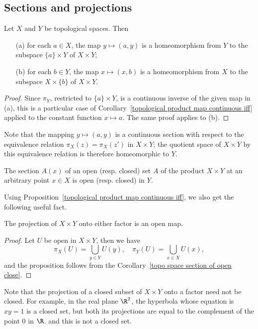 \subsection{Sections and projections}
\begin{proposition}\label{topo space section map homeomorphism}
Let $X$ and $Y$ be topological spaces. Then
\begin{itemize}
\item[(a)] for each $a\in X$, the map $y\mapsto(a,y)$ is a homeomorphism from $Y$ to the subspace $\{a\}\times Y$ of $X\times Y$;
\item[(b)] for each $b\in Y$, the map $x\mapsto(x,b)$ is a homeomorphism from $X$ to the subspace $X\times\{b\}$ of $X\times Y$.
\end{itemize}
\end{proposition}
\begin{proof}
Since $\pi_Y$, restricted to $\{a\}\times Y$, is a continuous inverse of the given map in (a), this is a particular case of Corollary~\ref{topological product map continuous iff} applied to the constant function $x\mapsto a$. The same proof applies to (b).
\end{proof}
Note that the mapping $y\mapsto(a,y)$ is a continuous section with respect to the equivalence relation $\pi_X(z)=\pi_X(z')$ in $X\times Y$; the quotient space of $X\times Y$ by this equivalence relation is therefore homeomorphic to $Y$.
\begin{corollary}\label{topo space section of open close}
The section $A(x)$ of an open (resp. closed) set $A$ of the product $X\times Y$ at an arbitrary point $x\in X$ is open (resp. closed) in $Y$.
\end{corollary}
Using Proposition~\ref{topological product map continuous iff}, we also get the following useful fact.
\begin{proposition}\label{topo space projection is open}
The projection of $X\times Y$ onto either factor is an open map.
\end{proposition}
\begin{proof}
Let $U$ be open in $X\times Y$, then we have 
\[\pi_X(U)=\bigcup_{y\in Y}U(y),\quad\pi_Y(U)=\bigcup_{x\in X}U(x),\]
and the proposition follows from the Corollary~\ref{topo space section of open close}.
\end{proof}
Note that the projection of a closed subset of $X\times Y$ onto a factor need not be closed. For example, in the real plane $\R^2$, the hyperbola whose equation is $xy=1$ is a closed set, but both its projections are equal to the complement of the point $0$ in $\R$. and this is not a closed set.
